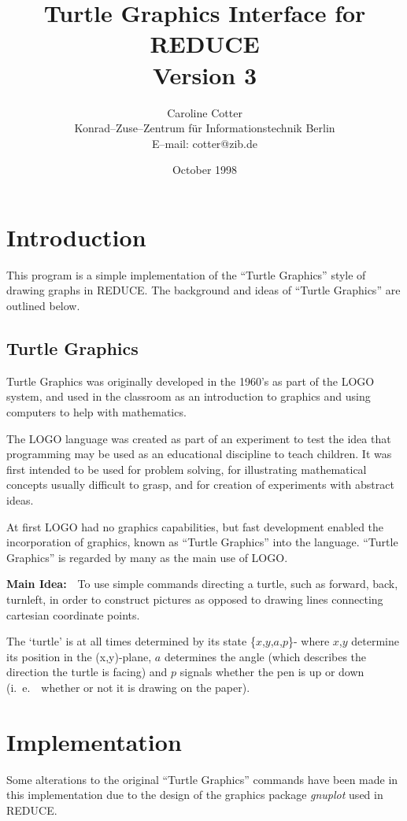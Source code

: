 \documentclass[11pt]{article}
\title{{\bf Turtle Graphics Interface for REDUCE \\
            Version 3}}
\author{Caroline Cotter \\ Konrad--Zuse--Zentrum f\"ur Informationstechnik
        Berlin \\ E--mail: cotter@zib.de}
\date{October 1998}
\begin{document}
\maketitle


\section{Introduction}
 This program is a simple implementation of the ``Turtle Graphics''
style of drawing graphs in {\small REDUCE}. The background and ideas of
``Turtle Graphics'' are outlined below.

\subsection{Turtle Graphics}

Turtle Graphics was originally developed in the 1960's as part of the
LOGO system, and used in the classroom as an introduction to graphics
and using computers to help with mathematics.

The LOGO language was created as part of an experiment to test the idea
that programming may be used as an educational discipline to teach children.
It was first intended to be used for problem solving, for illustrating
mathematical concepts usually difficult to grasp, and for creation of
experiments with abstract ideas.

At first LOGO had no graphics capabilities, but fast development enabled
the incorporation of graphics, known as ``Turtle Graphics'' into the
language. ``Turtle Graphics'' is regarded by many as the main use of
LOGO.


{\bf Main Idea:}\ \ To use simple commands directing a turtle, such as
forward, back, turnleft, in order to construct pictures as opposed to
drawing lines connecting cartesian coordinate points.

The `turtle' is at all times determined by its state \{$x$,$y$,$a$,$p$\}-
where $x$,$y$ determine its position in the {\mbox (x,y)-plane}, $a$
determines the angle (which describes the direction the turtle is
facing) and $p$ signals whether the pen is up or down (i.\ e.\ \  whether or
not it is drawing on the paper).


\section{Implementation}
Some alterations to the original ``Turtle Graphics'' commands have been
made in this implementation due to the design of the graphics package
{\em gnuplot} used in {\small REDUCE}.
\end{document}
